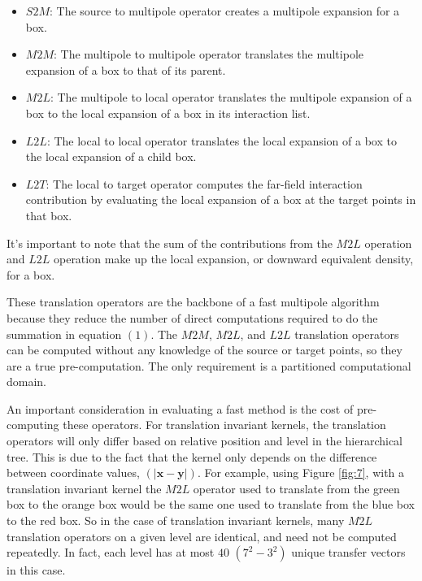 \documentclass[11pt, oneside]{article}   	%
\begin{document}
\begin{itemize}
\item $S2M$: The source to multipole operator creates a multipole expansion for a box.

\item $M2M$: The multipole to multipole operator translates the multipole expansion of a box to that of its parent.

\item $M2L$: The multipole to local operator translates the multipole expansion of a box to the local expansion of a box in its interaction list.

\item $L2L$: The local to local operator translates the local expansion of a box to the local expansion of a child box.

\item $L2T$: The local to target operator computes the far-field interaction contribution by evaluating the local expansion of a box at the target points in that box.
\end{itemize}

It's important to note that the sum of the contributions from the $M2L$ operation and $L2L$ operation make up the local expansion, or downward equivalent density, for a box.

These translation operators are the backbone of a fast multipole algorithm because they reduce the number of direct computations required to do the summation in equation $(1)$. The $M2M$, $M2L$, and $L2L$ translation operators can be computed without any knowledge of the source or target points, so they are a true pre-computation. The only requirement is a partitioned computational domain.

An important consideration in evaluating a fast method is the cost of pre-computing these operators. For translation invariant kernels, the translation operators will only differ based on relative position and level in the hierarchical tree. This is due to the fact that the kernel only depends on the difference between coordinate values, $(|\mathbf{x}-\mathbf{y}|)$. For example, using Figure \ref{fig:7}, with a translation invariant kernel the $M2L$ operator used to translate from the green box to the orange box would be the same one used to translate from the blue box to the red box. So in the case of translation invariant kernels, many $M2L$ translation operators on a given level are identical, and need not be computed repeatedly. In fact, each level has at most $40$ $(7^2-3^2)$ unique transfer vectors in this case.
\end{document}
